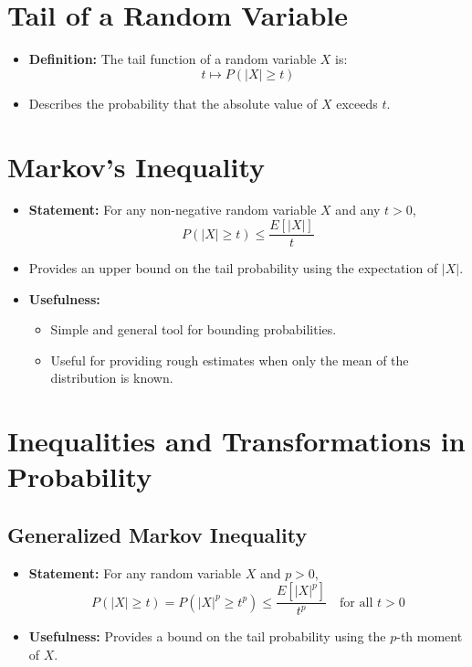 \documentclass{article}
\begin{document}
\section*{Tail of a Random Variable}
\begin{itemize}
    \item \textbf{Definition:} The tail function of a random variable $X$ is:
    \[
    t \mapsto P(|X| \ge t)
    \]
    \item Describes the probability that the absolute value of $X$ exceeds $t$.
\end{itemize}

\section*{Markov's Inequality}
\begin{itemize}
    \item \textbf{Statement:} For any non-negative random variable $X$ and any $t > 0$,
    \[
    P(|X| \ge t) \le \frac{E[|X|]}{t}
    \]
    \item Provides an upper bound on the tail probability using the expectation of $|X|$.
    \item \textbf{Usefulness:}
    \begin{itemize}
        \item Simple and general tool for bounding probabilities.
        \item Useful for providing rough estimates when only the mean of the distribution is known.
    \end{itemize}
\end{itemize}











\section*{Inequalities and Transformations in Probability}

\subsection*{Generalized Markov Inequality}
\begin{itemize}
    \item \textbf{Statement:} For any random variable $X$ and $p > 0$,
    \[
    P(|X| \ge t) = P(|X|^p \ge t^p) \le \frac{E[|X|^p]}{t^p} \quad \text{for all } t > 0
    \]
    \item \textbf{Usefulness:} Provides a bound on the tail probability using the $p$-th moment of $X$.
\end{itemize}
\end{document}
